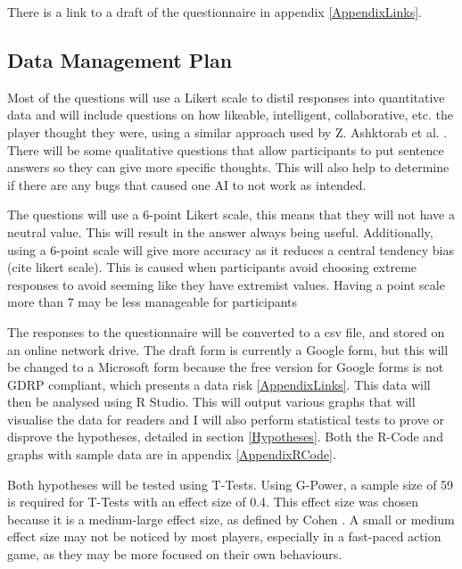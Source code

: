 \documentclass{IEEEtran}
\begin{document}
There is a link to a draft of the questionnaire in appendix \ref{AppendixLinks}.

\subsection{Data Management Plan}
\label{DataManagement}

Most of the questions will use a Likert scale to distil responses into quantitative data and will include questions on how likeable, intelligent, collaborative, etc. the player thought they were, using a similar approach used by Z. Ashktorab et al. \cite{SocialPerceptions2020}. There will be some qualitative questions that allow participants to put sentence answers so they can give more specific thoughts. This will also help to determine if there are any bugs that caused one AI to not work as intended.

The questions will use a 6-point Likert scale, this means that they will not have a neutral value. This will result in the answer always being useful. Additionally, using a 6-point scale will give more accuracy as it reduces a central tendency bias (cite likert scale). This is caused when participants avoid choosing extreme responses to avoid seeming like they have extremist values. Having a point scale more than 7 may be less manageable for participants

The responses to the questionnaire will be converted to a csv file, and stored on an online network drive. The draft form is currently a Google form, but this will be changed to a Microsoft form because the free version for Google forms is not GDRP compliant, which presents a data risk \ref{AppendixLinks}. This data will then be analysed using R Studio. This will output various graphs that will visualise the data for readers and I will also perform statistical tests to prove or disprove the hypotheses, detailed in section \ref{Hypotheses}. Both the R-Code and graphs with sample data are in appendix \ref{AppendixRCode}.

Both hypotheses will be tested using T-Tests. Using G-Power, a sample size of 59 is required for T-Tests with an effect size of 0.4. This effect size was chosen because it is a medium-large effect size, as defined by Cohen \cite{cohen1988statistical}. A small or medium effect size may not be noticed by most players, especially in a fast-paced action game, as they may be more focused on their own behaviours.

\end{document}
